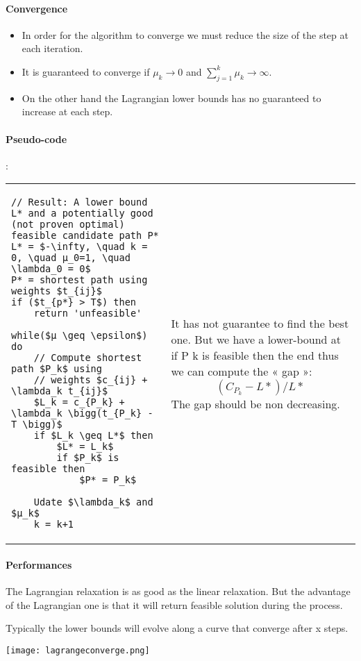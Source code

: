 \paragraph{Convergence}

\begin{itemize}
    \item In order for the algorithm to converge we must reduce the size
        of the step at each iteration. 
    \item It is guaranteed to converge if $\mu_{k} \rightarrow 0$ and
        $\sum^{k}_{j=1} \mu_{k} \rightarrow \infty$.
    \item On the other hand the Lagrangian lower bounds has no
        guaranteed to increase at each step.
    \end{itemize}

\paragraph{Pseudo-code}:

\begin{tabular}{m{9cm}m{6cm}}
\begin{lstlisting}[mathescape]
// Result: A lower bound L* and a potentially good (not proven optimal) feasible candidate path P*
L* = $-\infty, \quad k = 0, \quad µ_0=1, \quad \lambda_0 = 0$
P* = shortest path using weights $t_{ij}$
if ($t_{p*} > T$) then
    return 'unfeasible'

while($µ \geq \epsilon$) do
    // Compute shortest path $P_k$ using 
    // weights $c_{ij} + \lambda_k t_{ij}$
    $L_k = c_{P_k} + \lambda_k \bigg(t_{P_k} - T \bigg)$
    if $L_k \geq L*$ then
        $L* = L_k$
        if $P_k$ is feasible then
            $P* = P_k$

    Udate $\lambda_k$ and $µ_k$
    k = k+1
\end{lstlisting}
&
It has not guarantee to find the best
one. But we have a lower-bound at
if P k is feasible then
the end thus we can compute the
« gap »: $$(C_{P_k} - L*)/L*$$
The gap should be non decreasing.
\end{tabular}

\paragraph{Performances}

The Lagrangian relaxation is as good as the linear relaxation. But the
advantage of the Lagrangian one is that it will return feasible solution
during the process.

Typically the lower bounds will evolve along a curve that converge after x steps.

\centerline{\texttt{[image: lagrangeconverge.png]}}

